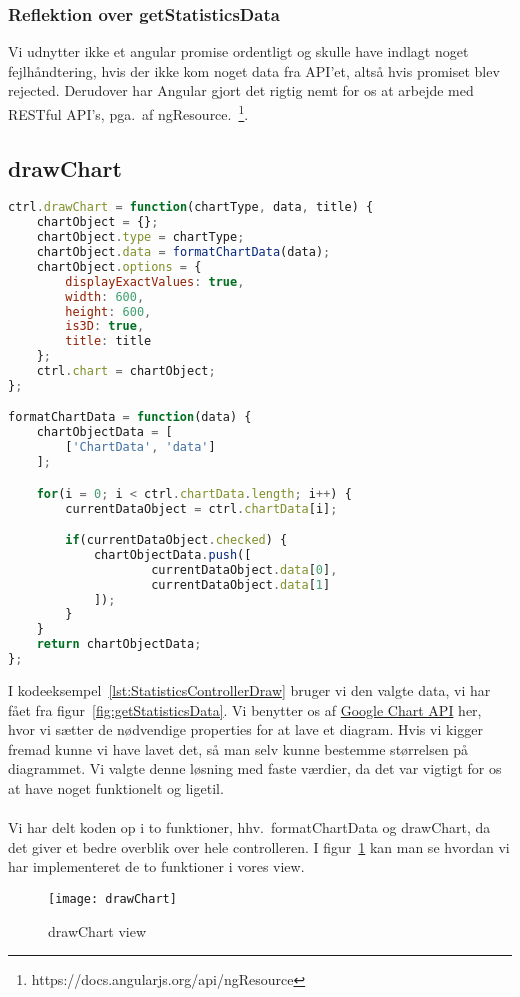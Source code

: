 \subsubsection{Reflektion over getStatisticsData}
Vi udnytter ikke et angular promise ordentligt og skulle have indlagt noget fejlhåndtering, hvis der ikke kom noget data fra API'et,
altså hvis promiset blev rejected.
Derudover har Angular gjort det rigtig nemt for os at arbejde med RESTful API's, pga.\ af ngResource.~\footnote{https://docs.angularjs.org/api/ngResource}.
\subsection{drawChart}
\begin{lstlisting}[caption={drawChart}, language={JavaScript}, label={lst:StatisticsControllerDraw}]
ctrl.drawChart = function(chartType, data, title) {
    chartObject = {};
    chartObject.type = chartType;
    chartObject.data = formatChartData(data);
    chartObject.options = {
        displayExactValues: true,
        width: 600,
        height: 600,
        is3D: true,
        title: title
    };
    ctrl.chart = chartObject;
};

formatChartData = function(data) {
    chartObjectData = [
        ['ChartData', 'data']
    ];

    for(i = 0; i < ctrl.chartData.length; i++) {
        currentDataObject = ctrl.chartData[i];

        if(currentDataObject.checked) {
            chartObjectData.push([
                    currentDataObject.data[0],
                    currentDataObject.data[1]
            ]);
        }
    }
    return chartObjectData;
};
\end{lstlisting}
I kodeeksempel~\ref{lst:StatisticsControllerDraw} bruger vi den valgte data, vi har fået fra figur~\ref{fig:getStatisticsData}.
Vi benytter os af \hyperlink{GoogleChartAPI}{Google Chart API} her, hvor vi sætter de nødvendige properties for at lave et diagram.
Hvis vi kigger fremad kunne vi have lavet det, så man selv kunne bestemme størrelsen på diagrammet. Vi valgte denne løsning med faste værdier, da det var vigtigt for os at have noget funktionelt
og ligetil.
\\\\
Vi har delt koden op i to funktioner, hhv.\ formatChartData og drawChart, da det giver et bedre overblik over hele controlleren.
I figur~\ref{fig:drawChart} kan man se hvordan vi har implementeret de to funktioner i vores view.
\begin{figure}[H]
\centering
\texttt{[image: drawChart]}
\caption{drawChart view}
\label{fig:drawChart}
\end{figure}
